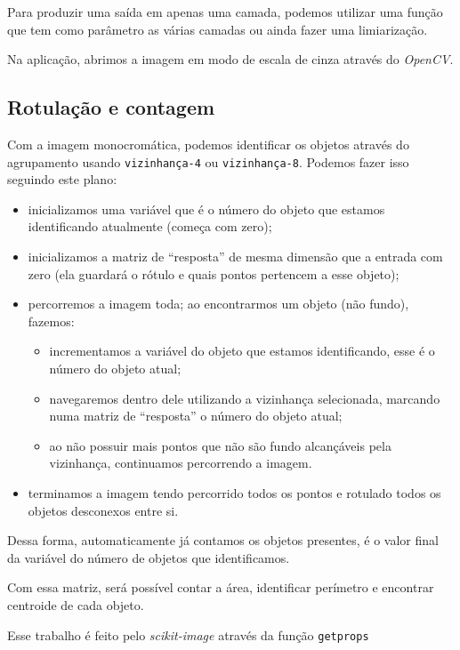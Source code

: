 \documentclass[brazilian,a4paper,twocolumn]{article}
\begin{document}
        Para produzir uma saída em apenas uma camada, podemos utilizar uma função que tem como parâmetro as várias camadas ou ainda fazer uma limiarização.

        Na aplicação, abrimos a imagem em modo de escala de cinza através do \emph{OpenCV}.

    \subsection{Rotulação e contagem}
    \label{sec:metodo-rotulacao}

        Com a imagem monocromática, podemos identificar os objetos através do agrupamento usando \texttt{vizinhança-4} ou \texttt{vizinhança-8}. Podemos fazer isso seguindo este plano:
        \begin{itemize}
            \item inicializamos uma variável que é o número do objeto que estamos identificando atualmente (começa com zero);
            \item inicializamos a matriz de ``resposta'' de mesma dimensão que a entrada com zero (ela guardará o rótulo e quais pontos pertencem a esse objeto);
            \item percorremos a imagem toda; ao encontrarmos um objeto (não fundo), fazemos:
            \begin{itemize}
                \item incrementamos a variável do objeto que estamos identificando, esse é o número do objeto atual;
                \item navegaremos dentro dele utilizando a vizinhança selecionada, marcando numa matriz de ``resposta'' o número do objeto atual;
                \item ao não possuir mais pontos que não são fundo alcançáveis pela vizinhança, continuamos percorrendo a imagem.
            \end{itemize}
            \item terminamos a imagem tendo percorrido todos os pontos e rotulado todos os objetos desconexos entre si.
        \end{itemize}

        Dessa forma, automaticamente já contamos os objetos presentes, é o valor final da variável do número de objetos que identificamos.

        Com essa matriz, será possível contar a área, identificar perímetro e encontrar centroide de cada objeto.

        Esse trabalho é feito pelo \emph{scikit-image} através da função \texttt{getprops}
\end{document}
